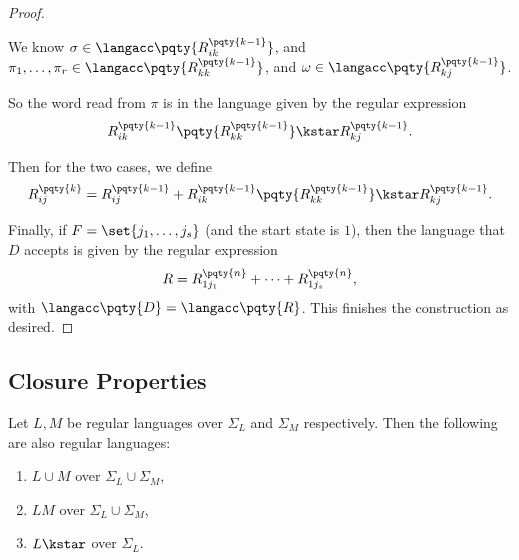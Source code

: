 \begin{proof}
\begin{enumerate}
\begin{center}
        \end{center}

        We know \(\sigma \in \langacc\pqty{R_{ik}^{\pqty{k - 1}}}\), and \(\pi_1, \ldots, \pi_r \in \langacc\pqty{R_{kk}^{\pqty{k - 1}}}\), and \(\omega \in \langacc\pqty{R_{kj}^{\pqty{k - 1}}}\).

        So the word read from \(\pi\) is in the language given by the regular expression
        \[
            R_{ik}^{\pqty{k - 1}} \pqty{R_{kk}^{\pqty{k - 1}}}\kstar R_{kj}^{\pqty{k - 1}}.
        \]
    \end{enumerate}

    Then for the two cases, we define
    \[
        R_{ij}^{\pqty{k}} = R_{ij}^{\pqty{k - 1}} + R_{ik}^{\pqty{k - 1}} \pqty{R_{kk}^{\pqty{k - 1}}}\kstar R_{kj}^{\pqty{k - 1}}.
    \]

    Finally, if \(F = \set{j_1, \ldots, j_s}\) (and the start state is \(1\)), then the language that \(D\) accepts is given by the regular expression
    \[
        R = R_{1 j_1}^{\pqty{n}} + \cdots + R_{1 j_s}^{\pqty{n}},
    \]
    with \(\langacc\pqty{D} = \langacc\pqty{R}\). This finishes the construction as desired.
\end{proof}

\subsection{Closure Properties}

\begin{theorem}
    Let \(L, M\) be regular languages over \(\Sigma_L\) and \(\Sigma_M\) respectively. Then the following are also regular languages:
    \begin{enumerate}[label=(\arabic*)]
        \item \(L \cup M\) over \(\Sigma_L \cup \Sigma_M\),
        \item \(LM\) over \(\Sigma_L \cup \Sigma_M\),
        \item \(L\kstar\) over \(\Sigma_L\).
    \end{enumerate}
\end{theorem}

